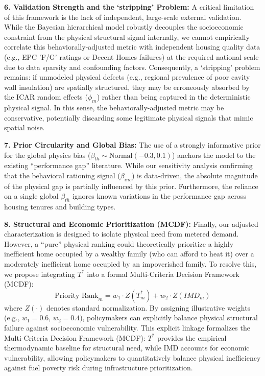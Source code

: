 \documentclass[11pt, a4paper, twocolumn, numbers]{elsarticle}
\begin{document}
\textbf{6. Validation Strength and the `stripping' Problem:} A critical limitation of this framework is the lack of independent, large-scale external validation. While the Bayesian hierarchical model robustly decouples the socioeconomic constraint from the physical structural signal internally, we cannot empirically correlate this behaviorally-adjusted metric with independent housing quality data (e.g., EPC 'F/G' ratings or Decent Homes failures) at the required national scale due to data sparsity and confounding factors. Consequently, a `stripping' problem remains: if unmodeled physical defects (e.g., regional prevalence of poor cavity wall insulation) are spatially structured, they may be erroneously absorbed by the ICAR random effects (\(\phi_m\)) rather than being captured in the deterministic physical signal. In this sense, the behaviorally-adjusted metric may be conservative, potentially discarding some legitimate physical signals that mimic spatial noise.

\textbf{7. Prior Circularity and Global Bias:} The use of a strongly informative prior for the global physics bias
(\(\beta_{th} \sim \text{Normal}(-0.3, 0.1)\)) anchors the model to the
existing ``performance gap'' literature. While our sensitivity analysis
confirming that the behavioral rationing signal (\(\beta_{inc}\)) is
data-driven, the absolute magnitude of the physical gap is partially
influenced by this prior. Furthermore, the reliance on a single global
\(\beta_{th}\) ignores known variations in the performance gap across
housing tenures and building types.

\textbf{8. Structural and Economic Prioritization (MCDF):} Finally, our adjusted characterization is designed to 
isolate physical need from metered demand. However, a ``pure'' physical 
ranking could theoretically prioritize a highly inefficient home 
occupied by a wealthy family (who can afford to heat it) over a 
moderately inefficient home occupied by an impoverished family. To resolve this, we propose integrating \(T^*\) into a formal Multi-Criteria Decision Framework (MCDF):
\begin{equation}
\text{Priority Rank}_m = w_1 \cdot Z(T^*_m) + w_2 \cdot Z(IMD_m)
\end{equation}
where \(Z(\cdot)\) denotes standard normalization. By assigning illustrative weights (e.g., \(w_1 = 0.6\), \(w_2 = 0.4\)), policymakers can explicitly balance physical structural failure against socioeconomic vulnerability. This explicit linkage formalizes the Multi-Criteria Decision Framework (MCDF): $T^*$ provides the empirical thermodynamic baseline for structural need, while IMD accounts for economic vulnerability, allowing policymakers to quantitatively balance physical inefficiency against fuel poverty risk during infrastructure prioritization.
\end{document}
